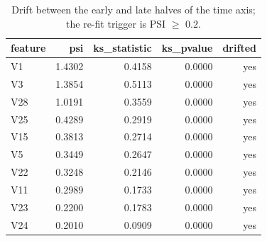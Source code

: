 \begin{table}[htbp]
\centering
\begin{tabular}{lrrrr}
\toprule
feature & psi & ks\_statistic & ks\_pvalue & drifted \\
\midrule
V1 & 1.4302 & 0.4158 & 0.0000 & yes \\
V3 & 1.3854 & 0.5113 & 0.0000 & yes \\
V28 & 1.0191 & 0.3559 & 0.0000 & yes \\
V25 & 0.4289 & 0.2919 & 0.0000 & yes \\
V15 & 0.3813 & 0.2714 & 0.0000 & yes \\
V5 & 0.3449 & 0.2647 & 0.0000 & yes \\
V22 & 0.3248 & 0.2146 & 0.0000 & yes \\
V11 & 0.2989 & 0.1733 & 0.0000 & yes \\
V23 & 0.2200 & 0.1783 & 0.0000 & yes \\
V24 & 0.2010 & 0.0909 & 0.0000 & yes \\
\bottomrule
\end{tabular}
\caption{Drift between the early and late halves of the time axis; the re-fit trigger is PSI $\geq$ 0.2.}
\label{tab:drift}
\end{table}
